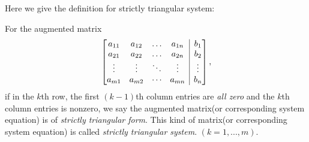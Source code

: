 Here we give the definition for strictly triangular system:
\begin{definition}
For the augmented matrix
\[
\left[
\begin{array}{@{}cccc|c@{}}
a_{11} & a_{12} & \dots & a_{1n} &  b_1 \\
a_{21} & a_{22} & \dots & a_{2n} &  b_2 \\
\vdots    & \vdots    & \ddots & \vdots    & \vdots \\
a_{m1} & a_{m2} & \cdots & a_{mn} &   b_n
\end{array}
\right],
\]
if in the $k$th row, the first $(k-1)$th column entries are \textit{all zero} and the $k$th column entries is nonzero, we say the augmented matrix(or corresponding system equation) is of \emph{strictly triangular form}. This kind of matrix(or corresponding system equation) is called \emph{strictly triangular system}.
$(k = 1, . . . , m).$
\end{definition}

